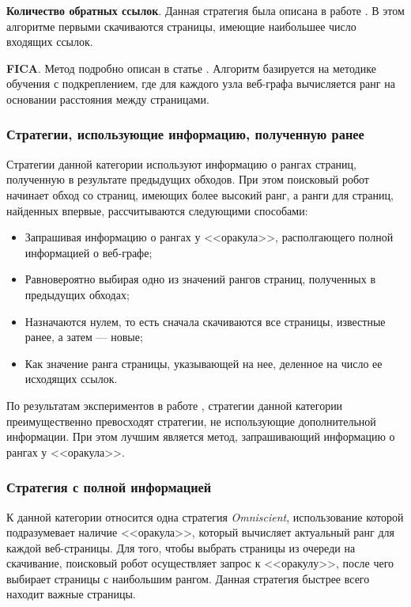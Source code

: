\textbf{Количество обратных ссылок}. Данная стратегия была описана в работе \cite{Cho2}. В этом алгоритме первыми скачиваются страницы, имеющие наибольшее число входящих ссылок.

\textbf{FICA}. Метод подробно описан в статье \cite{FICA}. Алгоритм базируется на методике обучения с подкреплением, где для каждого узла веб-графа вычисляется ранг на основании расстояния между страницами.

\subsubsection*{Стратегии, использующие информацию, полученную ранее}

Стратегии данной категории используют информацию о рангах страниц, полученную в результате предыдущих обходов. При этом поисковый робот начинает обход со страниц, имеющих более высокий ранг, а ранги для страниц, найденных впервые, рассчитываются следующими способами: 

\begin{itemize}
\item Запрашивая информацию о рангах у <<оракула>>, располгающего полной информацией о веб-графе;
\item Равновероятно выбирая одно из значений рангов страниц, полученных в предыдущих обходах;
\item Назначаются нулем, то есть сначала скачиваются все страницы, известные ранее, а затем --- новые;
\item Как значение ранга страницы, указывающей на нее, деленное на число ее исходящих ссылок.
\end{itemize}

По результатам экспериментов в работе \cite{Castillo}, стратегии данной категории преимущественно превосходят стратегии, не использующие дополнительной информации. При этом лучшим является метод, запрашивающий информацию о рангах у <<оракула>>.

\subsubsection*{Стратегия с полной информацией}

К данной категории относится одна стратегия \textit{Omniscient}, использование которой подразумевает наличие <<оракула>>, который вычисляет актуальный ранг для каждой веб-страницы. Для того, чтобы выбрать страницы из очереди на скачивание, поисковый робот осуществляет запрос к <<оракулу>>, после чего выбирает страницы с наибольшим рангом. Данная стратегия быстрее всего находит важные страницы.
 
